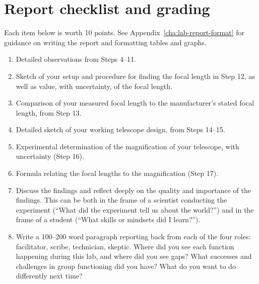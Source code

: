 \section{Report checklist and grading}

Each item below is worth 10 points. See Appendix\ \ref{cha:lab-report-format} for guidance on writing the report and formatting tables and graphs.

\begin{enumerate}
	
	\item Detailed observations from Steps 4--11.
	
	\item Sketch of your setup and procedure for finding the focal length in Step 12, as well as value, with uncertainty, of the focal length.
	
	\item Comparison of your measured focal length to the manufacturer's stated focal length, from Step 13.
	
	\item Detailed sketch of your working telescope design, from Steps 14--15.
	
	\item Experimental determination of the magnification of your telescope, with uncertainty (Step 16).
	
	\item Formula relating the focal lengths to the magnification (Step 17).
	
	\item Discuss the findings and reflect deeply on the quality and importance of the findings. This can be both in the frame of a scientist conducting the experiment (``What did the experiment tell us about the world?'') and in the frame of a student (``What skills or mindsets did I learn?'').
	
	\item Write a 100--200 word paragraph reporting back from each of the four roles: facilitator, scribe, technician, skeptic. Where did you see each function happening during this lab, and where did you see gaps? What successes and challenges in group functioning did you have? What do you want to do differently next time?
\end{enumerate}


